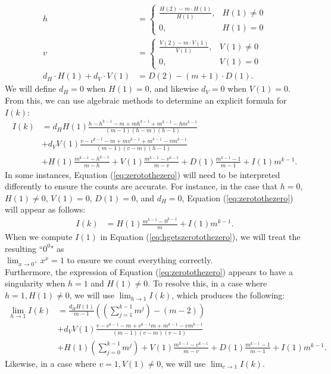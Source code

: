 \documentclass{article}
\theoremstyle{plain}
\numberwithin{equation}{section}
\numberwithin{table}{section}
\numberwithin{figure}{section}
\begin{document}
\begin{align}
h &= \begin{cases}
\frac{H(2) - m\cdot H(1)}{H(1)}, & H(1) \neq 0 \\
0, & H(1) = 0
\end{cases} \\
v &= \begin{cases}
\frac{V(2) - m\cdot V(1)}{V(1)}, & V(1) \neq 0 \\
0, & V(1) = 0
\end{cases} \\
d_H \cdot H(1) + d_V \cdot V(1) &= D(2) - (m+1) \cdot D(1).
\end{align}
We will define $d_H = 0$ when $H(1) = 0$, and likewise $d_V = 0$ when $V(1) = 0$. From this, we can use algebraic methods to determine an explicit formula for $I(k)$:
\begin{align}
I(k) &= d_H H(1) \frac{h - h^{k-1} - m + m h^{k-1} + m^{k-1} - h m^{k-1}}{(m-1)(h-m)(h-1)}\nonumber\\& %
+ d_V V(1) \frac{v - v^{k-1} - m + m v^{k-1} + m^{k-1} - v m^{k-1}}{(m-1)(v-m)(h-1)}\nonumber\\& %
+ H(1) \frac{m^{k-1} - h^{k-1}}{m-h}
+ V(1) \frac{m^{k-1} - v^{k-1}}{m-v}
+ D(1) \frac{m^{k-1} - 1}{m-1}
+ I(1) m^{k-1}. \label{eq:zerotothezero}
\end{align}
In some instances, Equation (\ref{eq:zerotothezero}) will need to be interpreted differently to ensure the counts are accurate. For instance, in the case that $h = 0$, $H(1) \neq 0$, $V(1) = 0$, $D(1) = 0$, and $d_H = 0$, Equation (\ref{eq:zerotothezero}) will appear as follows:
\begin{align}
I(k) &= H(1) \frac{m^{k-1} - 0^{k-1}}{m}
+ I(1) m^{k-1}. \label{eq:hgetszerotothezero}
\end{align}
When we compute $I(1)$ in Equation (\ref{eq:hgetszerotothezero}), we will treat the resulting ``$0^0$" as\\ $\displaystyle \lim_{x\rightarrow 0^+} x^x = 1$ to ensure we count everything correctly. \\

Furthermore, the expression of Equation (\ref{eq:zerotothezero}) appears to have a singularity when $h = 1$ and $H(1) \neq 0$. To resolve this, in a case where $h=1, H(1) \neq 0$, we will use $\displaystyle \lim_{h\rightarrow 1} I(k)$, which produces the following:
\begin{align}
\lim_{h\rightarrow 1} I(k) &= \frac{d_H H(1)}{m-1} \left(\left(\sum_{j=1}^{k-1} m^j\right) - (m-2)\right)\nonumber\\&
+ d_V V(1) \frac{v - v^{k-1} - m + v^{k-1} m + m^{k-1} - v m^{k-1}}{(m-1)(v-m)(v-1)}\nonumber\\& %
+ H(1) \left(\sum_{j=0}^{k-1} m^j\right)
+ V(1) \frac{m^{k-1} - v^{k-1}}{m-v}
+ D(1) \frac{m^{k-1} - 1}{m-1}
+ I(1) m^{k-1}.
\end{align}
Likewise, in a case where $v=1, V(1) \neq 0$, we will use $\displaystyle \lim_{v\rightarrow 1} I(k)$. \\
\end{document}
